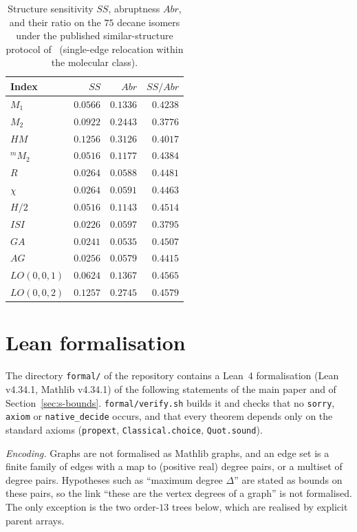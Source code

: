\documentclass[a5paper, 10pt]{article}
\theoremstyle{plain}
\theoremstyle{remark}
\theoremstyle{definition}
\begin{document}
\begin{table}[htbp]
\centering
\caption{Structure sensitivity $SS$, abruptness $Abr$, and their
ratio on the $75$ decane isomers under the published
similar-structure protocol of~\cite{FurtulaGutmanDehmer2013SS}
(single-edge relocation within the molecular class).}
\label{tab:s-fgdss}
\small
\begin{tabular}{lrrr}
\toprule
Index & $SS$ & $Abr$ & $SS/Abr$\\
\midrule
$M_1$ & $0.0566$ & $0.1336$ & $0.4238$\\
$M_2$ & $0.0922$ & $0.2443$ & $0.3776$\\
$HM$ & $0.1256$ & $0.3126$ & $0.4017$\\
${}^{m}\!M_2$ & $0.0516$ & $0.1177$ & $0.4384$\\
$R$ & $0.0264$ & $0.0588$ & $0.4481$\\
$\chi$ & $0.0264$ & $0.0591$ & $0.4463$\\
$H/2$ & $0.0516$ & $0.1143$ & $0.4514$\\
$ISI$ & $0.0226$ & $0.0597$ & $0.3795$\\
$GA$ & $0.0241$ & $0.0535$ & $0.4507$\\
$AG$ & $0.0256$ & $0.0579$ & $0.4415$\\
$LO(0,0,1)$ & $0.0624$ & $0.1367$ & $0.4565$\\
$LO(0,0,2)$ & $0.1257$ & $0.2745$ & $0.4579$\\
\bottomrule
\end{tabular}
\end{table}

\section{Lean formalisation}\label{sec:s-lean}

The directory \texttt{formal/} of the repository contains a Lean~4
formalisation (Lean v4.34.1, Mathlib v4.34.1) of the following
statements of the main paper and of Section~\ref{sec:s-bounds}. \texttt{formal/verify.sh} builds it and
checks that no \texttt{sorry}, \texttt{axiom} or \texttt{native\_decide}
occurs, and that every theorem depends only on the standard
axioms (\texttt{propext}, \texttt{Classical.choice}, \texttt{Quot.sound}).

\emph{Encoding.} Graphs are not formalised as Mathlib graphs, and an edge
set is a finite family of edges with a map to (positive real) degree
pairs, or a multiset of degree pairs. Hypotheses such as ``maximum degree
$\Delta$'' are stated as bounds on these pairs, so the link ``these are
the vertex degrees of a graph'' is not formalised. The only
exception is the two order-$13$ trees below, which are realised by
explicit parent arrays.
\end{document}

